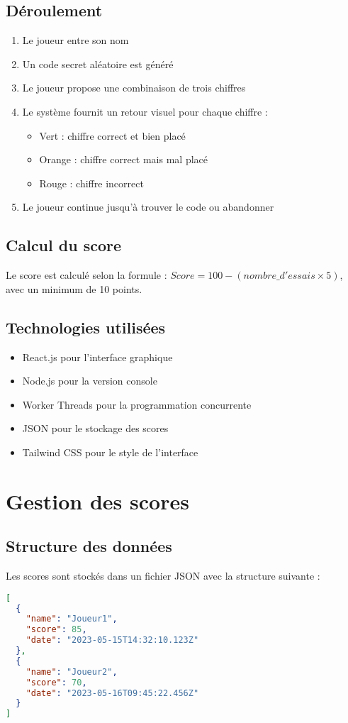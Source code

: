 \documentclass{article}
\begin{document}
\subsection{Déroulement}
\begin{enumerate}
    \item Le joueur entre son nom
    \item Un code secret aléatoire est généré
    \item Le joueur propose une combinaison de trois chiffres
    \item Le système fournit un retour visuel pour chaque chiffre :
    \begin{itemize}
        \item Vert : chiffre correct et bien placé
        \item Orange : chiffre correct mais mal placé
        \item Rouge : chiffre incorrect
    \end{itemize}
    \item Le joueur continue jusqu'à trouver le code ou abandonner
\end{enumerate}

\subsection{Calcul du score}
Le score est calculé selon la formule : $Score = 100 - (nombre\_d'essais \times 5)$, avec un minimum de 10 points.


\subsection{Technologies utilisées}
\begin{itemize}
    \item React.js pour l'interface graphique
    \item Node.js pour la version console
    \item Worker Threads pour la programmation concurrente
    \item JSON pour le stockage des scores
    \item Tailwind CSS pour le style de l'interface
\end{itemize}



\section{Gestion des scores}
\subsection{Structure des données}
Les scores sont stockés dans un fichier JSON avec la structure suivante :
\begin{lstlisting}[language=JSON, caption=Structure du fichier scores.json]
[
  {
    "name": "Joueur1",
    "score": 85,
    "date": "2023-05-15T14:32:10.123Z"
  },
  {
    "name": "Joueur2",
    "score": 70,
    "date": "2023-05-16T09:45:22.456Z"
  }
]
\end{lstlisting}
\end{document}
